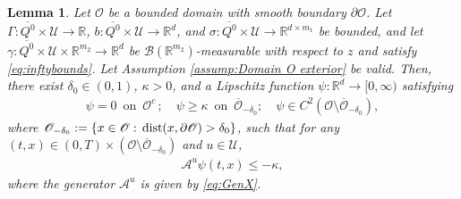 \documentclass[amscd,amssymb,11pt]{article}
\newtheorem{lemma}[theorem]{Lemma}
\numberwithin{theorem}{section}
\numberwithin{equation}{section}
\begin{document}
\begin{lemma}\label{lem:barfunbdy}
Let $\mathscr{O}$ be a bounded domain with smooth boundary $\partial\mathscr{O}$. Let $\Gamma:\overline{Q^{0}}\times\mathcal{U}\rightarrow\mathbb{R}$, $b:\overline{Q^{0}}\times\mathcal{U}\rightarrow\mathbb{R}^{d}$, and $\sigma:\overline{Q^{0}}\times\mathcal{U}\rightarrow\mathbb{R}^{d\times m_{1}}$ be bounded, and let $\gamma:\overline{Q^{0}}\times\mathcal{U}\times\mathbb{R}^{m_{2}}\rightarrow\mathbb{R}^{d}$ be $\mathcal{B}(\mathbb{R}^{m_{2}})$-measurable with respect to $z$ and satisfy \eqref{eq:inftybounds}. Let Assumption \ref{assump:Domain O exterior} be valid. Then, there exist $\delta_{0}\in(0,1)$, $\kappa>0$, and a Lipschitz function $\psi:\mathbb{R}^{d}\rightarrow [0,\infty)$ satisfying
\begin{align*}
\psi=0\,\,\,\text{on }\,\mathscr{O}^{c}\,;\quad\psi\geq\kappa\,\,\,\text{on }\,\overline{\mathscr{O}}_{-\delta_{0}};\quad\psi\in C^{2}(\mathscr{O}\setminus\overline{\mathscr{O}}_{-\delta_{0}}),
\end{align*}
where $\mathscr{O}_{-\delta_{0}}:=\{x\in\mathscr{O}:\,{\rm dist}(x,\partial\mathscr{O})>\delta_{0}\}$, such that for any $(t,x)\in(0,T)\times(\mathscr{O}\setminus\overline{\mathscr{O}}_{-\delta_{0}})$ and $u\in\mathcal{U}$,
\begin{align*}
\mathscr{A}^{u}\psi(t,x)\leq -\kappa,
\end{align*}
where the generator $\mathscr{A}^{u}$ is given by \eqref{eq:GenX}.
\end{lemma}
\end{document}
